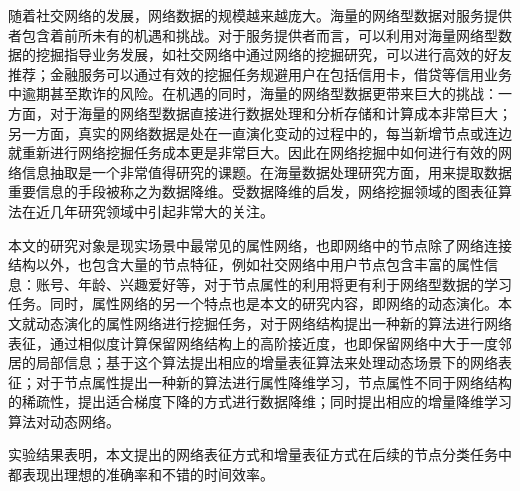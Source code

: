 随着社交网络的发展，网络数据的规模越来越庞大。海量的网络型数据对服务提供者包含着前所未有的机遇和挑战。对于服务提供者而言，可以利用对海量网络型数据的挖掘指导业务发展，如社交网络中通过网络的挖掘研究，可以进行高效的好友推荐；金融服务可以通过有效的挖掘任务规避用户在包括信用卡，借贷等信用业务中逾期甚至欺诈的风险。在机遇的同时，海量的网络型数据更带来巨大的挑战：一方面，对于海量的网络型数据直接进行数据处理和分析存储和计算成本非常巨大；另一方面，真实的网络数据是处在一直演化变动的过程中的，每当新增节点或连边就重新进行网络挖掘任务成本更是非常巨大。因此在网络挖掘中如何进行有效的网络信息抽取是一个非常值得研究的课题。在海量数据处理研究方面，用来提取数据重要信息的手段被称之为数据降维。受数据降维的启发，网络挖掘领域的图表征算法在近几年研究领域中引起非常大的关注。

本文的研究对象是现实场景中最常见的属性网络，也即网络中的节点除了网络连接结构以外，也包含大量的节点特征，例如社交网络中用户节点包含丰富的属性信息：账号、年龄、兴趣爱好等，对于节点属性的利用将更有利于网络型数据的学习任务。同时，属性网络的另一个特点也是本文的研究内容，即网络的动态演化。本文就动态演化的属性网络进行挖掘任务，对于网络结构提出一种新的算法进行网络表征，通过相似度计算保留网络结构上的高阶接近度，也即保留网络中大于一度邻居的局部信息；基于这个算法提出相应的增量表征算法来处理动态场景下的网络表征；对于节点属性提出一种新的算法进行属性降维学习，节点属性不同于网络结构的稀疏性，提出适合梯度下降的方式进行数据降维；同时提出相应的增量降维学习算法对动态网络。

实验结果表明，本文提出的网络表征方式和增量表征方式在后续的节点分类任务中都表现出理想的准确率和不错的时间效率。